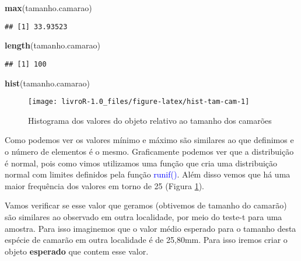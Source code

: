 \documentclass[14pt,titlepage, oneside, openany, a4paper]{book}
\newenvironment{Shaded}{\begin{snugshade}}{\end{snugshade}}
\newcommand{\KeywordTok}[1]{\textcolor[rgb]{0.13,0.29,0.53}{\textbf{#1}}}
\newcommand{\NormalTok}[1]{#1}
\begin{document}
\begin{Shaded}
\begin{Highlighting}[]
\KeywordTok{max}\NormalTok{(tamanho.camarao)}
\end{Highlighting}
\end{Shaded}

\begin{verbatim}
## [1] 33.93523
\end{verbatim}

\begin{Shaded}
\begin{Highlighting}[]
\KeywordTok{length}\NormalTok{(tamanho.camarao)}
\end{Highlighting}
\end{Shaded}

\begin{verbatim}
## [1] 100
\end{verbatim}

\begin{Shaded}
\begin{Highlighting}[]
\KeywordTok{hist}\NormalTok{(tamanho.camarao)}
\end{Highlighting}
\end{Shaded}

\begin{figure}[H]

{\centering \texttt{[image: livroR-1.0\_files/figure-latex/hist-tam-cam-1]} 

}

\caption{Histograma dos valores do objeto relativo ao tamanho dos camarões}\label{fig:hist-tam-cam}
\end{figure}

Como podemos ver os valores mínimo e máximo são similares ao que definimos e o número de elementos é o mesmo. Graficamente podemos ver que a distribuição é normal, pois como vimos utilizamos uma função que cria uma distribuição normal com limites definidos pela função \textcolor{blue}{runif()}. Além disso vemos que há uma maior frequência dos valores em torno de 25 (Figura \ref{fig:hist-tam-cam}).

Vamos verificar se esse valor que geramos (obtivemos de tamanho do camarão) são similares ao observado em outra localidade, por meio do teste-t para uma amostra. Para isso imaginemos que o valor médio esperado para o tamanho desta espécie de camarão em outra localidade é de 25,80mm. Para isso iremos criar o objeto \textbf{esperado} que contem esse valor.
\end{document}
